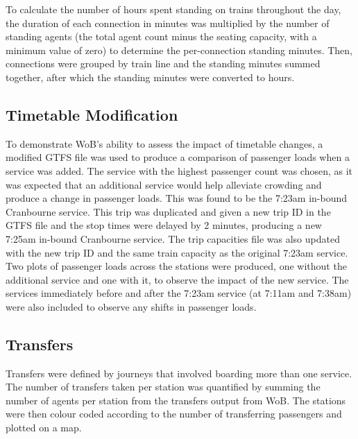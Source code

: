 To calculate the number of hours spent standing on trains throughout the day, the duration of each connection in minutes was multiplied by the number of standing agents (the total agent count minus the seating capacity, with a minimum value of zero) to determine the per-connection standing minutes. Then, connections were grouped by train line and the standing minutes summed together, after which the standing minutes were converted to hours.

\subsection{Timetable Modification}
To demonstrate WoB's ability to assess the impact of timetable changes, a modified GTFS file was used to produce a comparison of passenger loads when a service was added. The service with the highest passenger count was chosen, as it was expected that an additional service would help alleviate crowding and produce a change in passenger loads. This was found to be the 7:23am in-bound Cranbourne service. This trip was duplicated and given a new trip ID in the GTFS file and the stop times were delayed by 2 minutes, producing a new 7:25am in-bound Cranbourne service. The trip capacities file was also updated with the new trip ID and the same train capacity as the original 7:23am service. Two plots of passenger loads across the stations were produced, one without the additional service and one with it, to observe the impact of the new service. The services immediately before and after the 7:23am service (at 7:11am and 7:38am) were also included to observe any shifts in passenger loads. 

\subsection{Transfers}
Transfers were defined by journeys that involved boarding more than one service. The number of transfers taken per station was quantified by summing the number of agents per station from the transfers output from WoB. The stations were then colour coded according to the number of transferring passengers and plotted on a map. 


